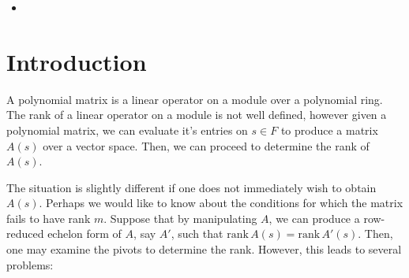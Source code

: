 \documentclass{amsart}
\theoremstyle{definition}
\theoremstyle{remark}
\numberwithin{equation}{section}
\begin{document}
\begin{itemize}
\item {}
\end{itemize}

\newpage

\setcounter{page}{1}

\section{Introduction}

A polynomial matrix is a linear operator on a module over a polynomial ring. The rank of a linear operator on a module is not well defined, however given a polynomial matrix, we can evaluate it's entries on $s \in F$ to produce a matrix $A(s)$ over a vector space. Then, we can proceed to determine the rank of $A(s)$.

The situation is slightly different if one does not immediately wish to obtain $A(s)$. Perhaps we would like to know about the conditions for which the matrix fails to have rank $m$. Suppose that by manipulating $A$, we can produce a row-reduced echelon form of $A$, say $A'$, such that $\mathrm{rank}\,A(s) = \mathrm{rank}\,A'(s)$. Then, one may examine the pivots to determine the rank. However, this leads to several problems:
\end{document}

